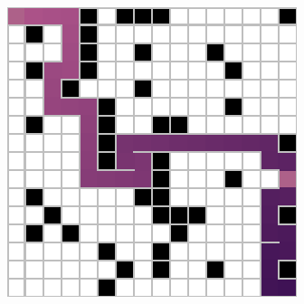 \documentclass[letter]{article}
\begin{document}
\begin{questions}
\begin{figure}
		\caption{}\label{fig:q2-5}
		\endminipage\hfill
		\includegraphics[width=\linewidth]{../pics/16/DFS quickGoal 43 43 42.png}
		\caption{}\label{fig:q2-6}
		\endminipage
	\end{figure}


\end{questions}
\end{document}
